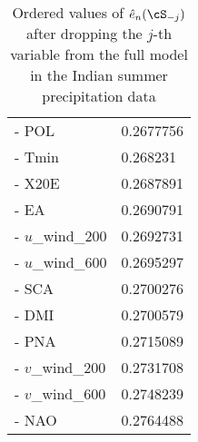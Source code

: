 \begin{table}
\begin{scriptsize}
\begin{tabular}{l|l}
    - POL                   & 0.2677756 \\
    - Tmin                  & 0.268231  \\
    - X20E                  & 0.2687891 \\
    - EA                    & 0.2690791 \\
    - $u$\_wind\_200          & 0.2692731 \\
    - $u$\_wind\_600          & 0.2695297 \\
    - SCA                   & 0.2700276 \\
    - DMI                   & 0.2700579 \\
    - PNA                   & 0.2715089 \\
    - $v$\_wind\_200          & 0.2731708 \\
    - $v$\_wind\_600          & 0.2748239 \\
    - NAO                   & 0.2764488 \\ \hline
    \end{tabular}
\end{scriptsize}
\caption{Ordered values of  $\hat e_n (\cS_{-j})$ after dropping the $j$-th variable from the full model in the Indian summer precipitation data}
\label{table:raintable}
\end{table}

